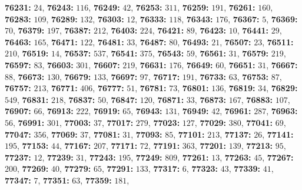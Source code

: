 \textsf{\bfseries 76231:} $24$, \textsf{\bfseries 76243:} $116$, \textsf{\bfseries 76249:} $42$, \textsf{\bfseries 76253:} $311$, \textsf{\bfseries 76259:} $191$, \textsf{\bfseries 76261:} $160$, \textsf{\bfseries 76283:} $109$, \textsf{\bfseries 76289:} $132$, \textsf{\bfseries 76303:} $12$, \textsf{\bfseries 76333:} $118$, \textsf{\bfseries 76343:} $176$, \textsf{\bfseries 76367:} $5$, \textsf{\bfseries 76369:} $70$, \textsf{\bfseries 76379:} $197$, \textsf{\bfseries 76387:} $212$, \textsf{\bfseries 76403:} $224$, \textsf{\bfseries 76421:} $89$, \textsf{\bfseries 76423:} $10$, \textsf{\bfseries 76441:} $29$, \textsf{\bfseries 76463:} $165$, \textsf{\bfseries 76471:} $122$, \textsf{\bfseries 76481:} $33$, \textsf{\bfseries 76487:} $80$, \textsf{\bfseries 76493:} $21$, \textsf{\bfseries 76507:} $23$, \textsf{\bfseries 76511:} $210$, \textsf{\bfseries 76519:} $14$, \textsf{\bfseries 76537:} $537$, \textsf{\bfseries 76541:} $375$, \textsf{\bfseries 76543:} $59$, \textsf{\bfseries 76561:} $31$, \textsf{\bfseries 76579:} $219$, \textsf{\bfseries 76597:} $83$, \textsf{\bfseries 76603:} $301$, \textsf{\bfseries 76607:} $219$, \textsf{\bfseries 76631:} $176$, \textsf{\bfseries 76649:} $60$, \textsf{\bfseries 76651:} $31$, \textsf{\bfseries 76667:} $88$, \textsf{\bfseries 76673:} $130$, \textsf{\bfseries 76679:} $133$, \textsf{\bfseries 76697:} $97$, \textsf{\bfseries 76717:} $191$, \textsf{\bfseries 76733:} $63$, \textsf{\bfseries 76753:} $87$, \textsf{\bfseries 76757:} $213$, \textsf{\bfseries 76771:} $406$, \textsf{\bfseries 76777:} $51$, \textsf{\bfseries 76781:} $73$, \textsf{\bfseries 76801:} $136$, \textsf{\bfseries 76819:} $34$, \textsf{\bfseries 76829:} $549$, \textsf{\bfseries 76831:} $218$, \textsf{\bfseries 76837:} $50$, \textsf{\bfseries 76847:} $120$, \textsf{\bfseries 76871:} $33$, \textsf{\bfseries 76873:} $167$, \textsf{\bfseries 76883:} $107$, \textsf{\bfseries 76907:} $66$, \textsf{\bfseries 76913:} $222$, \textsf{\bfseries 76919:} $65$, \textsf{\bfseries 76943:} $131$, \textsf{\bfseries 76949:} $42$, \textsf{\bfseries 76961:} $287$, \textsf{\bfseries 76963:} $56$, \textsf{\bfseries 76991:} $301$, \textsf{\bfseries 77003:} $37$, \textsf{\bfseries 77017:} $279$, \textsf{\bfseries 77023:} $127$, \textsf{\bfseries 77029:} $380$, \textsf{\bfseries 77041:} $69$, \textsf{\bfseries 77047:} $356$, \textsf{\bfseries 77069:} $37$, \textsf{\bfseries 77081:} $31$, \textsf{\bfseries 77093:} $85$, \textsf{\bfseries 77101:} $213$, \textsf{\bfseries 77137:} $26$, \textsf{\bfseries 77141:} $195$, \textsf{\bfseries 77153:} $44$, \textsf{\bfseries 77167:} $207$, \textsf{\bfseries 77171:} $72$, \textsf{\bfseries 77191:} $363$, \textsf{\bfseries 77201:} $139$, \textsf{\bfseries 77213:} $95$, \textsf{\bfseries 77237:} $12$, \textsf{\bfseries 77239:} $31$, \textsf{\bfseries 77243:} $195$, \textsf{\bfseries 77249:} $809$, \textsf{\bfseries 77261:} $13$, \textsf{\bfseries 77263:} $45$, \textsf{\bfseries 77267:} $200$, \textsf{\bfseries 77269:} $40$, \textsf{\bfseries 77279:} $65$, \textsf{\bfseries 77291:} $133$, \textsf{\bfseries 77317:} $6$, \textsf{\bfseries 77323:} $43$, \textsf{\bfseries 77339:} $41$, \textsf{\bfseries 77347:} $7$, \textsf{\bfseries 77351:} $63$, \textsf{\bfseries 77359:} $181$, 
